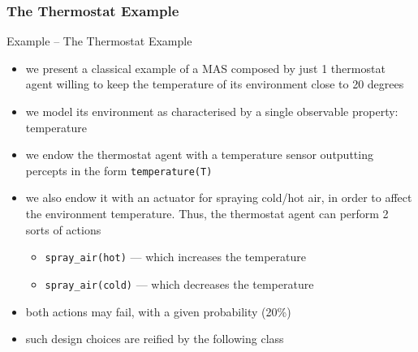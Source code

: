 \documentclass[presentation]{beamer}\mode<presentation>{\usetheme{AMSBolognaFC}}
\begin{document}
\subsubsection{The Thermostat Example}

\begin{frame}[c, allowframebreaks]{Example \theJasonExample{} -- The Thermostat Example}
\begin{itemize}
    
    \item we present a classical example of a MAS composed by just 1 thermostat agent willing to keep the temperature of its environment close to 20 degrees
    
    \vspace{.3cm}
    
    \item we model its environment as characterised by a single observable property: \alert{temperature}
    
    \vspace{.3cm}
    
    \item we endow the thermostat agent with a \alert{temperature sensor} outputting percepts in the form \alert{\texttt{temperature(T)}}
    
    \vspace{.3cm}
    
    \item we also endow it with an \alert{actuator} for \alert{spraying} cold/hot air, in order to affect the environment temperature.
    Thus, the thermostat agent can perform 2 sorts of actions
    \begin{itemize}
        \item \lstinline[language=Jason]{spray_air(hot)} --- which increases the temperature
        \item \lstinline[language=Jason]{spray_air(cold)} --- which decreases the temperature
    \end{itemize}
    
    \vspace{.3cm}
    
    \item both actions may fail, with a given probability (20\%)
    
    \framebreak
    
    \item such design choices are reified by the following class
    
    

\end{itemize}
\end{frame}
\end{document}
